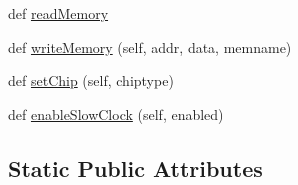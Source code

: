 \begin{DoxyCompactItemize}
def \hyperlink{classsoftware_1_1chipwhisperer_1_1hardware_1_1naeusb_1_1programmer__avr_1_1AVRISP_afac4cb4bf4cbf1760ceed0734f8acfe6}{read\+Memory}
\item 
def \hyperlink{classsoftware_1_1chipwhisperer_1_1hardware_1_1naeusb_1_1programmer__avr_1_1AVRISP_a23ee0a22ef4d2d8e2222b4d7d99f7481}{write\+Memory} (self, addr, data, memname)
\item 
def \hyperlink{classsoftware_1_1chipwhisperer_1_1hardware_1_1naeusb_1_1programmer__avr_1_1AVRISP_ab483cf3d55283aacdd836b697be73cb0}{set\+Chip} (self, chiptype)
\item 
def \hyperlink{classsoftware_1_1chipwhisperer_1_1hardware_1_1naeusb_1_1programmer__avr_1_1AVRISP_a4b60ce77b3e5106d2f083acba7258eca}{enable\+Slow\+Clock} (self, enabled)
\end{DoxyCompactItemize}
\subsection*{Static Public Attributes}
